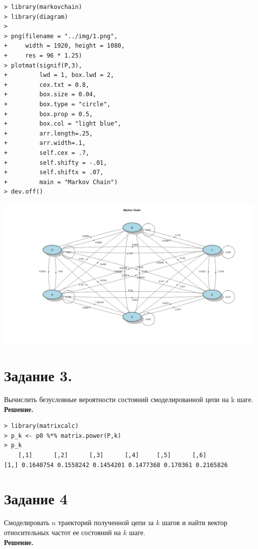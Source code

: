 \documentclass[14pt,a4paper]{scrartcl}
\begin{document}
\begin{verbatim}
> library(markovchain)
> library(diagram)
> 
> png(filename = "../img/1.png",
+     width = 1920, height = 1080,
+     res = 96 * 1.25)
> plotmat(signif(P,3), 
+         lwd = 1, box.lwd = 2, 
+         cex.txt = 0.8, 
+         box.size = 0.04, 
+         box.type = "circle", 
+         box.prop = 0.5,
+         box.col = "light blue",
+         arr.length=.25,
+         arr.width=.1,
+         self.cex = .7,
+         self.shifty = -.01,
+         self.shiftx = .07,
+         main = "Markov Chain")
> dev.off()
\end{verbatim}

\includegraphics[angle=90,origin=t, scale=0.75]{../img/1.png}

\pagebreak

\section*{Задание 3.}
Вычислить безусловные вероятности состояний смоделированной цепи на k шаге.\\
\textbf{Решение.}\\

\begin{verbatim}
> library(matrixcalc)
> p_k <- p0 %*% matrix.power(P,k)
> p_k
	[,1]      [,2]      [,3]      [,4]     [,5]      [,6]
[1,] 0.1640754 0.1558242 0.1454201 0.1477368 0.170361 0.2165826
\end{verbatim}


\section*{Задание 4}
Смоделировать $n$ траекторий полученной цепи за $k$ шагов и найти вектор относительных частот ее состояний на $k$ шаге.\\
\textbf{Решение.}\\
\end{document}
